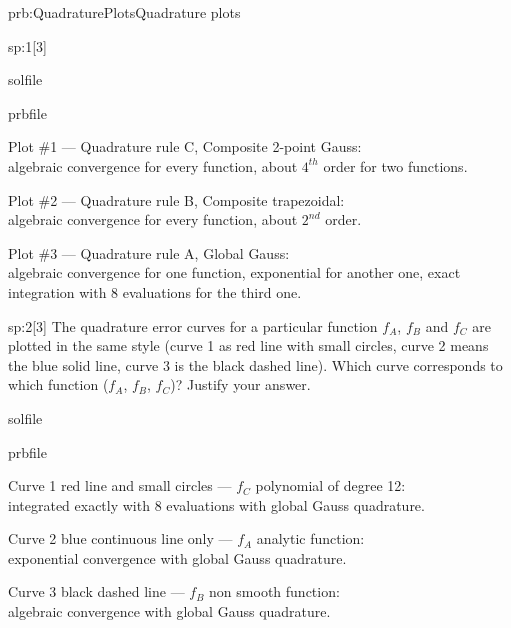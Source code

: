 \begin{samproblem}{prb:QuadraturePlots}{Quadrature plots}
\begin{subproblem}{sp:1}[3]
  
  \begin{samwriteprbpart}{solfile}
    \begin{writeverbatim}{prbfile}
      \begin{samsolution}
        Plot \#1 --- Quadrature rule C, Composite 2-point Gauss:\\
        algebraic convergence for every function, about $4^{th}$ order for two functions.

        Plot \#2 --- Quadrature rule B, Composite trapezoidal:\\ algebraic convergence for every function, about $2^{nd}$ order.

        Plot \#3 --- Quadrature rule A, Global Gauss:\\ algebraic convergence for one function, 
        exponential for another one, exact integration with 8 evaluations for the third one.
     \end{samsolution}
    \end{writeverbatim}
  \end{samwriteprbpart}

\end{subproblem}


\begin{subproblem}{sp:2}[3]
  The quadrature error curves for a particular function $f_A$, $f_B$ and $f_C$ are plotted in the same style 
  (curve 1 as red line with small circles, curve 2 means the blue solid line, curve 3 is the black dashed line).
  Which curve corresponds to which function ($f_A$, $f_B$, $f_C$)?
  Justify your answer.

  \begin{samwriteprbpart}{solfile}
    \begin{writeverbatim}{prbfile}
      \begin{samsolution}
        Curve 1 red line and small circles --- $f_C$ polynomial of degree 12:\\
        integrated exactly with 8 evaluations with global Gauss quadrature.

        Curve 2 blue continuous line only --- $f_A$ analytic function:\\
        exponential convergence with global Gauss quadrature.

        Curve 3 black dashed line --- $f_B$ non smooth function:\\
        algebraic convergence with global Gauss quadrature.
     \end{samsolution}
    \end{writeverbatim}
  \end{samwriteprbpart}

\end{subproblem}

\end{samproblem}
